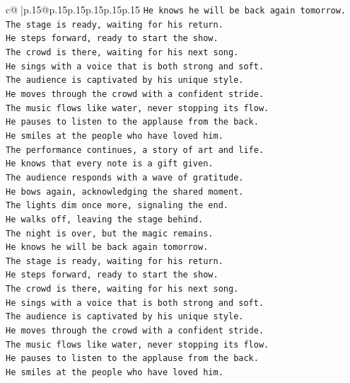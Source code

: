 \documentclass{article}
\begin{document}
{\begin{supertabular}{c@{$\;$}|p{.15\linewidth}@{}p{.15\linewidth}p{.15\linewidth}p{.15\linewidth}p{.15\linewidth}p{.15\linewidth}}
{{{\texttt{He knows he will be back again tomorrow.} \\
\texttt{The stage is ready, waiting for his return.} \\
\texttt{He steps forward, ready to start the show.} \\
\texttt{The crowd is there, waiting for his next song.} \\
\texttt{He sings with a voice that is both strong and soft.} \\
\texttt{The audience is captivated by his unique style.} \\
\texttt{He moves through the crowd with a confident stride.} \\
\texttt{The music flows like water, never stopping its flow.} \\
\texttt{He pauses to listen to the applause from the back.} \\
\texttt{He smiles at the people who have loved him.} \\
\texttt{The performance continues, a story of art and life.} \\
\texttt{He knows that every note is a gift given.} \\
\texttt{The audience responds with a wave of gratitude.} \\
\texttt{He bows again, acknowledging the shared moment.} \\
\texttt{The lights dim once more, signaling the end.} \\
\texttt{He walks off, leaving the stage behind.} \\
\texttt{The night is over, but the magic remains.} \\
\texttt{He knows he will be back again tomorrow.} \\
\texttt{The stage is ready, waiting for his return.} \\
\texttt{He steps forward, ready to start the show.} \\
\texttt{The crowd is there, waiting for his next song.} \\
\texttt{He sings with a voice that is both strong and soft.} \\
\texttt{The audience is captivated by his unique style.} \\
\texttt{He moves through the crowd with a confident stride.} \\
\texttt{The music flows like water, never stopping its flow.} \\
\texttt{He pauses to listen to the applause from the back.} \\
\texttt{He smiles at the people who have loved him.} \\
}}}
\end{supertabular}}
\end{document}
